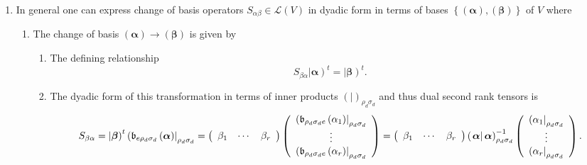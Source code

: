 \documentclass[aps,preprint]{revtex4}
\begin{document}
\begin{enumerate}
\item In general one can express change of basis operators $S_{\alpha \beta
}\in \mathcal{L}\left( V\right) $ in dyadic form in terms of bases $\left\{
\left( \boldsymbol{\alpha }\right) ,\left( \boldsymbol{\beta }\right)
\right\} $ of $V$ where

\begin{enumerate}
\item The change of basis $\left( \boldsymbol{\alpha }\right) \rightarrow
\left( \boldsymbol{\beta }\right) $ is given by

\begin{enumerate}
\item The defining relationship 
\begin{equation}
S_{\beta \alpha }\left\vert \boldsymbol{\alpha }\right) ^{t}=\left\vert 
\boldsymbol{\beta }\right) ^{t}.
\end{equation}

\item The dyadic form of this transformation in terms of inner products $%
\left( \left. {}\right\vert \right) _{\rho _{d}\sigma _{d}}$ and thus dual
second rank tensors is 
\begin{equation}
S_{\beta \alpha }=\left\vert \boldsymbol{\beta }\right) ^{t}\left( \mathfrak{%
b}_{e\rho _{d}\sigma _{d}}\left( \boldsymbol{\alpha }\right) \right\vert
_{\rho _{d}\sigma _{d}}=\left( 
\begin{array}{ccc}
\beta _{1} & \cdots & \beta _{r}%
\end{array}%
\right) \left( 
\begin{array}{c}
\left( \mathfrak{b}_{\rho _{d}\sigma _{d}e}\left( \alpha _{1}\right)
\right\vert _{\rho _{d}\sigma _{d}} \\ 
\vdots \\ 
\left( \mathfrak{b}_{\rho _{d}\sigma _{d}e}\left( \alpha _{r}\right)
\right\vert _{\rho _{d}\sigma _{d}}%
\end{array}%
\right) =\left( 
\begin{array}{ccc}
\beta _{1} & \cdots & \beta _{r}%
\end{array}%
\right) \left( \left. \boldsymbol{\alpha }\right\vert \boldsymbol{\alpha }%
\right) _{\rho _{d}\sigma _{d}}^{-1}\left( 
\begin{array}{c}
\left( \alpha _{1}\right\vert _{\rho _{d}\sigma _{d}} \\ 
\vdots \\ 
\left( \alpha _{r}\right\vert _{\rho _{d}\sigma _{d}}%
\end{array}%
\right) .
\end{equation}


\end{enumerate}
\end{enumerate}
\end{enumerate}
\end{document}
